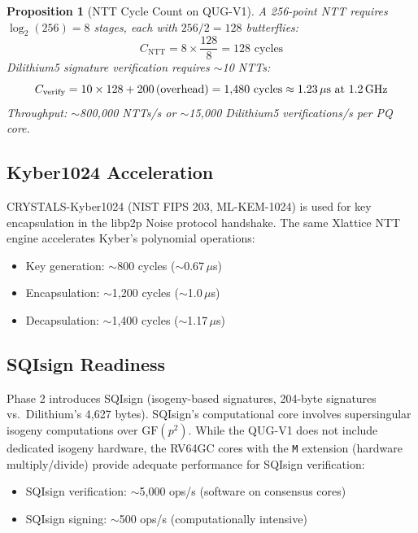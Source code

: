 \documentclass[11pt,a4paper]{article}
\newtheorem{proposition}[theorem]{Proposition}
\begin{document}
\begin{proposition}[NTT Cycle Count on QUG-V1]
A 256-point NTT requires $\log_2(256) = 8$ stages, each with $256/2 = 128$ butterflies:
\begin{equation}
    C_{\text{NTT}} = 8 \times \frac{128}{8} = 128 \text{ cycles}
\end{equation}
Dilithium5 signature verification requires $\sim$10 NTTs:
\begin{equation}
    C_{\text{verify}} = 10 \times 128 + 200\,(\text{overhead}) = 1{,}480 \text{ cycles} \approx 1.23\,\mu\text{s at 1.2\,GHz}
\end{equation}
Throughput: $\sim$800{,}000 NTTs/s or $\sim$15{,}000 Dilithium5 verifications/s per PQ core.
\end{proposition}

\subsection{Kyber1024 Acceleration}

CRYSTALS-Kyber1024 (NIST FIPS 203, ML-KEM-1024) is used for key encapsulation in the libp2p Noise protocol handshake. The same Xlattice NTT engine accelerates Kyber's polynomial operations:

\begin{itemize}
    \item Key generation: $\sim$800 cycles ($\sim$0.67\,$\mu$s)
    \item Encapsulation: $\sim$1{,}200 cycles ($\sim$1.0\,$\mu$s)
    \item Decapsulation: $\sim$1{,}400 cycles ($\sim$1.17\,$\mu$s)
\end{itemize}

\subsection{SQIsign Readiness}

Phase 2 introduces SQIsign (isogeny-based signatures, 204-byte signatures vs.\ Dilithium's 4{,}627 bytes). SQIsign's computational core involves supersingular isogeny computations over $\text{GF}(p^2)$. While the QUG-V1 does not include dedicated isogeny hardware, the RV64GC cores with the \texttt{M} extension (hardware multiply/divide) provide adequate performance for SQIsign verification:

\begin{itemize}
    \item SQIsign verification: $\sim$5{,}000 ops/s (software on consensus cores)
    \item SQIsign signing: $\sim$500 ops/s (computationally intensive)
\end{itemize}
\end{document}

